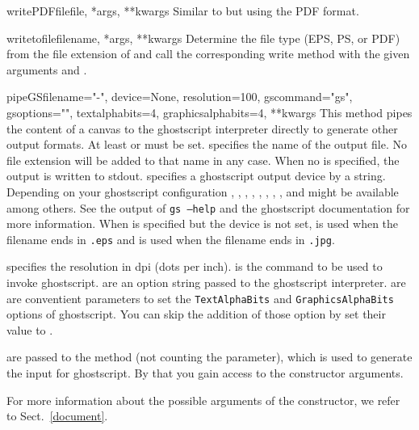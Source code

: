 \begin{methoddesc}{writePDFfile}{file, *args, **kwargs}
  Similar to  but using the PDF format.
\end{methoddesc}

\begin{methoddesc}{writetofile}{filename, *args, **kwargs}
  Determine the file type (EPS, PS, or PDF) from the file extension
  of  and call the corresponding write method with
  the given arguments  and .
\end{methoddesc}

\begin{methoddesc}{pipeGS}{filename="-", device=None, resolution=100,
                           gscommand="gs", gsoptions="",
                           textalphabits=4, graphicsalphabits=4, **kwargs}
  This method pipes the content of a canvas to the ghostscript
  interpreter directly to generate other output formats. At least
   or  must be set.  specifies
  the name of the output file. No file extension will be added to that
  name in any case. When no  is specified, the output is
  written to stdout.  specifies a ghostscript output
  device by a string. Depending on your ghostscript configuration
  , , , ,
  , , ,
  , and  might be available among
  others. See the output of \texttt{gs --help} and the ghostscript
  documentation for more information. When  is specified
  but the device is not set,  is used when the filename
  ends in \texttt{.eps} and  is used when the filename
  ends in \texttt{.jpg}.

   specifies the resolution in dpi (dots per inch).
   is the command to be used to invoke ghostscript.
   are an option string passed to the ghostscript
  interpreter.  are  are
  conventient parameters to set the \texttt{TextAlphaBits} and
  \texttt{GraphicsAlphaBits} options of ghostscript. You can skip
  the addition of those option by set their value to .

   are passed to the  method (not
  counting the  parameter), which is used to generate the
  input for ghostscript. By that you gain access to the
   constructor arguments.
\end{methoddesc}

For more information about the possible arguments of the
 constructor, we refer to Sect.~\ref{document}.

